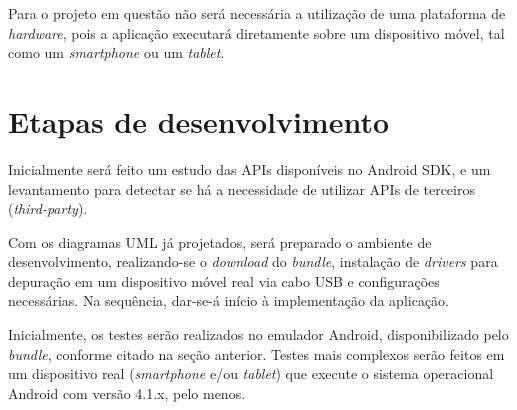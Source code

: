 Para o projeto em questão não será necessária a utilização de uma plataforma de \textit{hardware}, pois a aplicação executará diretamente sobre um dispositivo móvel, tal como um \textit{smartphone} ou um \textit{tablet}.

\section{Etapas de desenvolvimento}

Inicialmente será feito um estudo das APIs disponíveis no Android SDK, e um levantamento para detectar se há a necessidade de utilizar APIs de terceiros (\textit{third-party}). 

Com os diagramas UML já projetados, será preparado o ambiente de desenvolvimento, realizando-se o \textit{download} do \textit{bundle}, instalação de \textit{drivers} para depuração em um dispositivo móvel real via cabo USB e configurações necessárias. Na sequência, dar-se-á início à implementação da aplicação.

Inicialmente, os testes serão realizados no emulador Android, disponibilizado pelo \textit{bundle}, conforme citado na seção anterior. Testes mais complexos serão feitos em um dispositivo real (\textit{smartphone} e/ou \textit{tablet}) que execute o sistema operacional Android com versão 4.1.x, pelo menos.